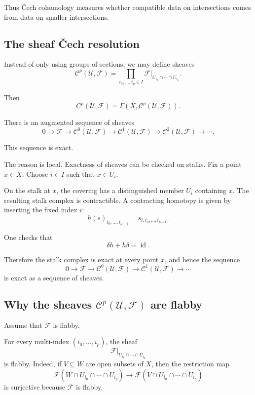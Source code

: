 \documentclass[12pt,a4paper]{article}
\theoremstyle{notespace}
\begin{document}
Thus \v{C}ech cohomology measures whether compatible data on intersections
comes from data on smaller intersections.

\subsection*{The sheaf \v{C}ech resolution}

Instead of only using groups of sections, we may define sheaves
\[
\mathcal C^p(\mathcal U,\mathcal F)
=
\prod_{i_0,\ldots,i_p\in I}
\mathcal F|_{U_{i_0}\cap\cdots\cap U_{i_p}}.
\]

Then
\[
C^p(\mathcal U,\mathcal F)
=
\Gamma(X,\mathcal C^p(\mathcal U,\mathcal F)).
\]

There is an augmented sequence of sheaves
\[
0\longrightarrow \mathcal F
\longrightarrow \mathcal C^0(\mathcal U,\mathcal F)
\longrightarrow \mathcal C^1(\mathcal U,\mathcal F)
\longrightarrow \mathcal C^2(\mathcal U,\mathcal F)
\longrightarrow \cdots.
\]

This sequence is exact.

The reason is local. Exactness of sheaves can be checked on stalks. Fix a
point $x\in X$. Choose $i\in I$ such that $x\in U_i$.

On the stalk at $x$, the covering has a distinguished member $U_i$
containing $x$. The resulting stalk complex is contractible. A contracting
homotopy is given by inserting the fixed index $i$:
\[
h(s)_{i_0,\ldots,i_{p-1}}
=
s_{i,i_0,\ldots,i_{p-1}}.
\]

One checks that
\[
\delta h+h\delta=\operatorname{id}.
\]

Therefore the stalk complex is exact at every point $x$, and hence the
sequence
\[
0\longrightarrow \mathcal F
\longrightarrow \mathcal C^0(\mathcal U,\mathcal F)
\longrightarrow \mathcal C^1(\mathcal U,\mathcal F)
\longrightarrow \cdots
\]
is exact as a sequence of sheaves.

\subsection*{Why the sheaves $\mathcal C^p(\mathcal U,\mathcal F)$ are flabby}

Assume that $\mathcal F$ is flabby.

For every multi-index $(i_0,\ldots,i_p)$, the sheaf
\[
\mathcal F|_{U_{i_0}\cap\cdots\cap U_{i_p}}
\]
is flabby. Indeed, if $V\subseteq W$ are open subsets of $X$, then the
restriction map
\[
\mathcal F(W\cap U_{i_0}\cap\cdots\cap U_{i_p})
\longrightarrow
\mathcal F(V\cap U_{i_0}\cap\cdots\cap U_{i_p})
\]
is surjective because $\mathcal F$ is flabby.
\end{document}
